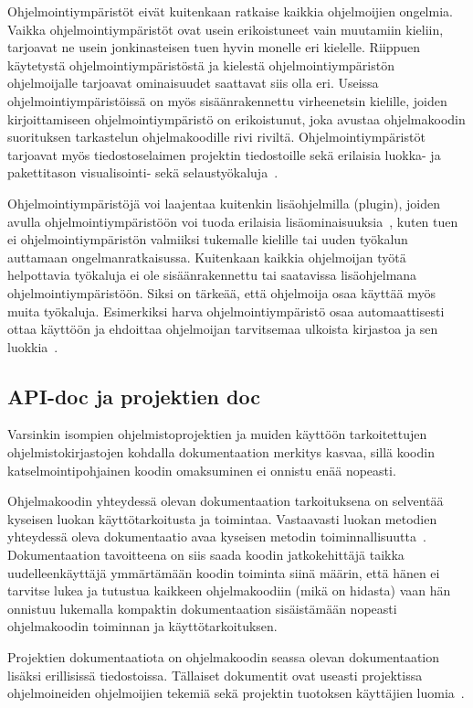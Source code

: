 \documentclass[finnish]{tktltiki2}
\theoremstyle{definition}
\theoremstyle{remark}
\begin{document}
Ohjelmointiympäristöt eivät kuitenkaan ratkaise kaikkia ohjelmoijien ongelmia. Vaikka ohjelmointiympäristöt ovat usein erikoistuneet vain muutamiin kieliin, tarjoavat ne usein jonkinasteisen tuen hyvin monelle eri kielelle. Riippuen käytetystä ohjelmointiympäristöstä ja kielestä ohjelmointiympäristön ohjelmoijalle tarjoavat ominaisuudet saattavat siis olla eri.
Useissa ohjelmointiympäristöissä on myös sisäänrakennettu virheenetsin kielille, joiden kirjoittamiseen ohjelmointiympäristö on erikoistunut, joka avustaa ohjelmakoodin suorituksen tarkastelun ohjelmakoodille rivi riviltä. Ohjelmointiympäristöt tarjoavat myös tiedostoselaimen projektin tiedostoille sekä erilaisia luokka- ja pakettitason visualisointi- sekä selaustyökaluja~\cite{eclipse-ide}.

Ohjelmointiympäristöjä voi laajentaa kuitenkin lisäohjelmilla (plugin), joiden avulla ohjelmointiympäristöön voi tuoda erilaisia lisäominaisuuksia~\cite{eclipse-ide}, kuten tuen ei ohjelmointiympäristön valmiiksi tukemalle kielille tai uuden työkalun auttamaan ongelmanratkaisussa. Kuitenkaan kaikkia ohjelmoijan työtä helpottavia työkaluja ei ole sisäänrakennettu tai saatavissa lisäohjelmana ohjelmointiympäristöön. Siksi on tärkeää, että ohjelmoija osaa käyttää myös muita työkaluja. Esimerkiksi harva ohjelmointiympäristö osaa automaattisesti ottaa käyttöön ja ehdoittaa ohjelmoijan tarvitsemaa ulkoista kirjastoa ja sen luokkia~\cite{jungloid-mining}.

\subsection{API-doc ja projektien doc}
Varsinkin isompien ohjelmistoprojektien ja muiden käyttöön tarkoitettujen ohjelmistokirjastojen kohdalla dokumentaation merkitys kasvaa, sillä koodin katselmointipohjainen koodin omaksuminen ei onnistu enää nopeasti.

Ohjelmakoodin yhteydessä olevan dokumentaation tarkoituksena on selventää kyseisen luokan käyttötarkoitusta ja toimintaa. Vastaavasti luokan metodien yhteydessä oleva dokumentaatio avaa kyseisen metodin toiminnallisuutta~\cite{javadoc}.
Dokumentaation tavoitteena on siis saada koodin jatkokehittäjä taikka uudelleenkäyttäjä ymmärtämään koodin toiminta siinä määrin, että hänen ei tarvitse lukea ja tutustua kaikkeen ohjelmakoodiin (mikä on hidasta) vaan hän onnistuu lukemalla kompaktin dokumentaation sisäistämään nopeasti ohjelmakoodin toiminnan ja käyttötarkoituksen.

Projektien dokumentaatiota on ohjelmakoodin seassa olevan dokumentaation lisäksi erillisissä tiedostoissa. Tällaiset dokumentit ovat useasti  projektissa ohjelmoineiden ohjelmoijien tekemiä sekä projektin tuotoksen käyttäjien luomia~\cite{using-wikis-in-sw}.
\end{document}
